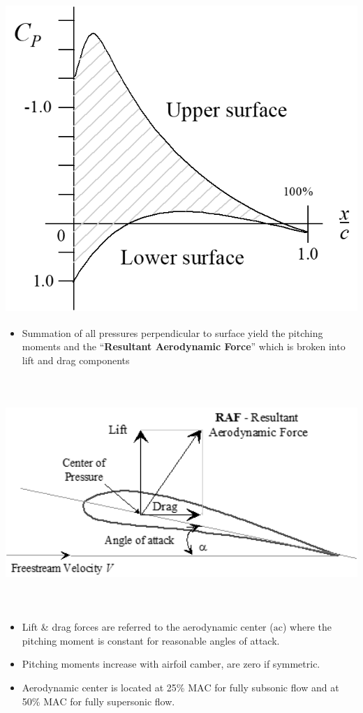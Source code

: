 \documentclass[
]{book}
\providecommand{\tightlist}{%
  \setlength{\itemsep}{0pt}\setlength{\parskip}{0pt}}
\begin{document}
\includegraphics[width=5.333in,height=4.625in]{media/05/image11.png}

\begin{itemize}
\tightlist
\item
  Summation of all pressures perpendicular to surface yield the pitching moments and the ``\textbf{Resultant Aerodynamic Force}'' which is broken into lift and drag components
\end{itemize}

\includegraphics[width=7.1in,height=3.44in]{media/05/image12.png}

\begin{itemize}
\tightlist
\item
  Lift \& drag forces are referred to the aerodynamic center (\(\mathrm{ac}\)) where the pitching moment is constant for reasonable angles of attack.
\item
  Pitching moments increase with airfoil camber, are zero if symmetric.
\item
  Aerodynamic center is located at 25\% \(\mathrm{MAC}\) for fully subsonic flow and at 50\% \(\mathrm{MAC}\) for fully supersonic flow.
\end{itemize}
\end{document}
